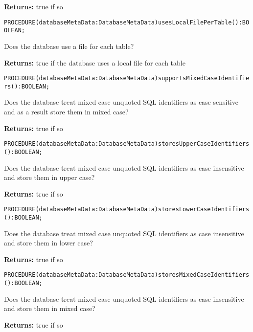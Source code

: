 {\bf Returns: } 
true if so 




\verb'PROCEDURE(databaseMetaData:DatabaseMetaData)usesLocalFilePerTable():BOOLEAN;'






Does the database use a file for each table? 


{\bf Returns: } 
true if the database uses a local file for each table 




\verb'PROCEDURE(databaseMetaData:DatabaseMetaData)supportsMixedCaseIdentifiers():BOOLEAN;'






Does the database treat mixed case unquoted SQL identifiers as case sensitive and as a result store them in mixed case?


{\bf Returns: } 
true if so 




\verb'PROCEDURE(databaseMetaData:DatabaseMetaData)storesUpperCaseIdentifiers():BOOLEAN;'






Does the database treat mixed case unquoted SQL identifiers as case insensitive and store them in upper case? 


{\bf Returns: } 
true if so 




\verb'PROCEDURE(databaseMetaData:DatabaseMetaData)storesLowerCaseIdentifiers():BOOLEAN;'






Does the database treat mixed case unquoted SQL identifiers as case insensitive and store them in lower case? 


{\bf Returns: } 
true if so 




\verb'PROCEDURE(databaseMetaData:DatabaseMetaData)storesMixedCaseIdentifiers():BOOLEAN;'






Does the database treat mixed case unquoted SQL identifiers as case insensitive and store them in mixed case? 


{\bf Returns: } 
true if so 


